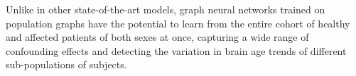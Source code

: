Unlike in other state-of-the-art models, graph neural networks trained on population graphs have the potential to learn from the entire cohort of healthy and affected patients of both sexes at once, capturing a wide range of confounding effects and detecting the variation in brain age trends of different sub-populations of subjects.







